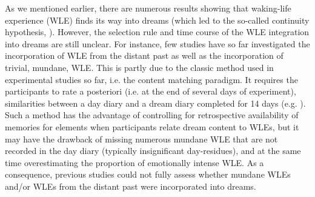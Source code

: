 As we mentioned earlier, there are numerous results showing that waking-life experience (WLE) finds its way into dreams (which led to the so-called continuity hypothesis, \citealp{schredl_continuity_2003}). However, the selection rule and time course of the WLE integration into dreams are still unclear. For instance, few studies have so far investigated the incorporation of WLE from the distant past as well as the incorporation of trivial, mundane, WLE. This is partly due to the classic method used in experimental studies so far, i.e. the content matching paradigm. It requires the participants to rate a posteriori (i.e. at the end of several days of experiment), similarities between a day diary and a dream diary completed for 14 days (e.g. \citealp{schredl_factors_2006, malinowski_evidence_2014}). Such a method has the advantage of controlling for retrospective availability of memories for elements when participants relate dream content to WLEs, but it may have the drawback of missing numerous mundane WLE that are not recorded in the day diary (typically insignificant day-residues), and at the same time overestimating the proportion of emotionally intense WLE. As a consequence, previous studies could not fully assess whether mundane WLEs and/or WLEs from the distant past were incorporated into dreams.


